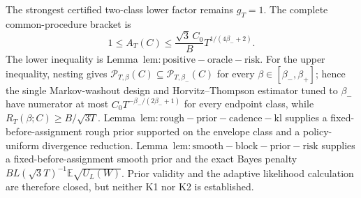The strongest certified two-class lower factor remains \(g_T=1\). The complete common-procedure bracket is
\[1\le A_T(C)\le \frac{\sqrt{3}\,C_0}{B}T^{1/(4\beta_-+2)}.\]
The lower inequality is Lemma~\(\mathrm{lem:positive-oracle-risk}\). For the upper inequality, nesting gives \(\mathcal P_{T,\beta}(C)\subseteq\mathcal P_{T,\beta_-}(C)\) for every \(\beta\in[\beta_-,\beta_+]\); hence the single Markov-washout design and Horvitz--Thompson estimator tuned to \(\beta_-\) have numerator at most \(C_0T^{-\beta_-/(2\beta_-+1)}\) for every endpoint class, while \(R_T(\beta;C)\ge B/\sqrt{3T}\). Lemma~\(\mathrm{lem:rough-prior-cadence-kl}\) supplies a fixed-before-assignment rough prior supported on the envelope class and a policy-uniform divergence reduction. Lemma~\(\mathrm{lem:smooth-block-prior-risk}\) supplies a fixed-before-assignment smooth prior and the exact Bayes penalty \(BL(\sqrt{3}T)^{-1}\mathbb E\sqrt{U_L(W)}\). Prior validity and the adaptive likelihood calculation are therefore closed, but neither K1 nor K2 is established.